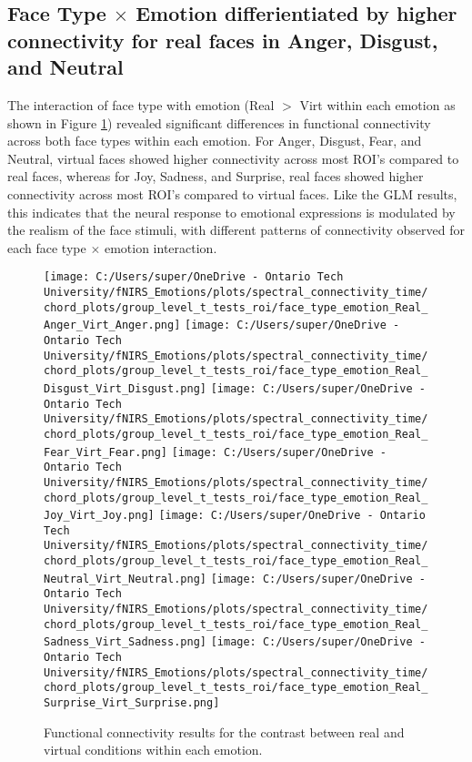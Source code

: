 \subsection{Face Type \texorpdfstring{$\times$}{x} Emotion differientiated by higher connectivity for real faces in Anger, Disgust, and Neutral}

The interaction of face type with emotion (Real $>$ Virt within each emotion as shown in Figure \ref{fig:fc_real_vs_virtual_emotion_analysis}) revealed significant differences in functional connectivity across both face types within each emotion.
For Anger, Disgust, Fear, and Neutral, virtual faces showed higher connectivity across most ROI's compared to real faces, whereas for Joy, Sadness, and Surprise, real faces showed higher connectivity across most ROI's compared to virtual faces.
Like the GLM results, this indicates that the neural response to emotional expressions is modulated by the realism of the face stimuli, with different patterns of connectivity observed for each face type \texorpdfstring{$\times$}{x} emotion interaction.

\begin{figure}[H]
  \centering
  \texttt{[image: C:/Users/super/OneDrive - Ontario Tech University/fNIRS\_Emotions/plots/spectral\_connectivity\_time/chord\_plots/group\_level\_t\_tests\_roi/face\_type\_emotion\_Real\_Anger\_Virt\_Anger.png]}
  \texttt{[image: C:/Users/super/OneDrive - Ontario Tech University/fNIRS\_Emotions/plots/spectral\_connectivity\_time/chord\_plots/group\_level\_t\_tests\_roi/face\_type\_emotion\_Real\_Disgust\_Virt\_Disgust.png]}
  \texttt{[image: C:/Users/super/OneDrive - Ontario Tech University/fNIRS\_Emotions/plots/spectral\_connectivity\_time/chord\_plots/group\_level\_t\_tests\_roi/face\_type\_emotion\_Real\_Fear\_Virt\_Fear.png]}
  \texttt{[image: C:/Users/super/OneDrive - Ontario Tech University/fNIRS\_Emotions/plots/spectral\_connectivity\_time/chord\_plots/group\_level\_t\_tests\_roi/face\_type\_emotion\_Real\_Joy\_Virt\_Joy.png]}
  \texttt{[image: C:/Users/super/OneDrive - Ontario Tech University/fNIRS\_Emotions/plots/spectral\_connectivity\_time/chord\_plots/group\_level\_t\_tests\_roi/face\_type\_emotion\_Real\_Neutral\_Virt\_Neutral.png]}
  \texttt{[image: C:/Users/super/OneDrive - Ontario Tech University/fNIRS\_Emotions/plots/spectral\_connectivity\_time/chord\_plots/group\_level\_t\_tests\_roi/face\_type\_emotion\_Real\_Sadness\_Virt\_Sadness.png]}
  \texttt{[image: C:/Users/super/OneDrive - Ontario Tech University/fNIRS\_Emotions/plots/spectral\_connectivity\_time/chord\_plots/group\_level\_t\_tests\_roi/face\_type\_emotion\_Real\_Surprise\_Virt\_Surprise.png]}
  \caption[FC: Face Type \texorpdfstring{$\times$}{x} Emotion Contrasts]{Functional connectivity results for the contrast between real and virtual conditions within each emotion.}
  \label{fig:fc_real_vs_virtual_emotion_analysis}
\end{figure}

